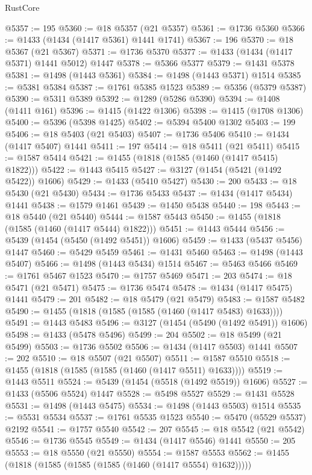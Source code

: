 \begin{lexlean}{RustCore}
\begin{coremodule}
@5357 := 195
@5360 := @18 @5357 (@21 @5357)
@5361 := @1736 @5360
@5366 := @1433 (@1434 (@1417 @5361) @1441 @1741)
@5367 := 196
@5370 := @18 @5367 (@21 @5367)
@5371 := @1736 @5370
@5377 := @1433 (@1434 (@1417 @5371) @1441 @5012) @1447
@5378 := @5366 @5377
@5379 := @1431 @5378
@5381 := @1498 (@1443 @5361)
@5384 := @1498 (@1443 @5371) @1514
@5385 := @5381 @5384
@5387 := @1761 @5385 @1523
@5389 := @5356 (@5379 @5387)
@5390 := @5311 @5389
@5392 := @1289 (@5286 @5390)
@5394 := @1408 (@1411 @161)
@5396 := @1415 (@1422 @1306)
@5398 := @1415 (@1708 @1306)
@5400 := @5396 (@5398 @1425)
@5402 := @5394 @5400 @1302
@5403 := 199
@5406 := @18 @5403 (@21 @5403)
@5407 := @1736 @5406
@5410 := @1434 (@1417 @5407) @1441
@5411 := 197
@5414 := @18 @5411 (@21 @5411)
@5415 := @1587 @5414
@5421 := @1455 (@1818 (@1585 (@1460 (@1417 @5415) @1822)))
@5422 := @1443 @5415
@5427 := @3127 (@1454 (@5421 (@1492 @5422)) @1606)
@5429 := @1433 (@5410 @5427)
@5430 := 200
@5433 := @18 @5430 (@21 @5430)
@5434 := @1736 @5433
@5437 := @1434 (@1417 @5434) @1441
@5438 := @1579 @1461
@5439 := @1450 @5438
@5440 := 198
@5443 := @18 @5440 (@21 @5440)
@5444 := @1587 @5443
@5450 := @1455 (@1818 (@1585 (@1460 (@1417 @5444) @1822)))
@5451 := @1443 @5444
@5456 := @5439 (@1454 (@5450 (@1492 @5451)) @1606)
@5459 := @1433 (@5437 @5456) @1447
@5460 := @5429 @5459
@5461 := @1431 @5460
@5463 := @1498 (@1443 @5407)
@5466 := @1498 (@1443 @5434) @1514
@5467 := @5463 @5466
@5469 := @1761 @5467 @1523
@5470 := @1757 @5469
@5471 := 203
@5474 := @18 @5471 (@21 @5471)
@5475 := @1736 @5474
@5478 := @1434 (@1417 @5475) @1441
@5479 := 201
@5482 := @18 @5479 (@21 @5479)
@5483 := @1587 @5482
@5490 := @1455 (@1818 (@1585 (@1585 (@1460 (@1417 @5483) @1633))))
@5491 := @1443 @5483
@5496 := @3127 (@1454 (@5490 (@1492 @5491)) @1606)
@5498 := @1433 (@5478 @5496)
@5499 := 204
@5502 := @18 @5499 (@21 @5499)
@5503 := @1736 @5502
@5506 := @1434 (@1417 @5503) @1441
@5507 := 202
@5510 := @18 @5507 (@21 @5507)
@5511 := @1587 @5510
@5518 := @1455 (@1818 (@1585 (@1585 (@1460 (@1417 @5511) @1633))))
@5519 := @1443 @5511
@5524 := @5439 (@1454 (@5518 (@1492 @5519)) @1606)
@5527 := @1433 (@5506 @5524) @1447
@5528 := @5498 @5527
@5529 := @1431 @5528
@5531 := @1498 (@1443 @5475)
@5534 := @1498 (@1443 @5503) @1514
@5535 := @5531 @5534
@5537 := @1761 @5535 @1523
@5540 := @5470 (@5529 @5537) @2192
@5541 := @1757 @5540
@5542 := 207
@5545 := @18 @5542 (@21 @5542)
@5546 := @1736 @5545
@5549 := @1434 (@1417 @5546) @1441
@5550 := 205
@5553 := @18 @5550 (@21 @5550)
@5554 := @1587 @5553
@5562 := @1455 (@1818 (@1585 (@1585 (@1585 (@1460 (@1417 @5554) @1632)))))

\end{coremodule}
\end{lexlean}

